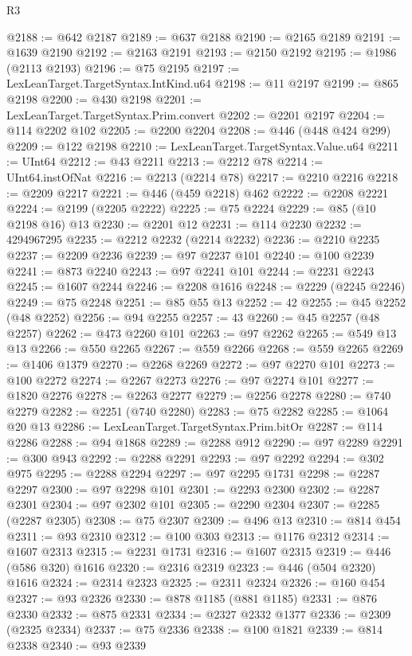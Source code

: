 \begin{lexlean}{R3}
\begin{coremodule}
@2188 := @642 @2187
@2189 := @637 @2188
@2190 := @2165 @2189
@2191 := @1639 @2190
@2192 := @2163 @2191
@2193 := @2150 @2192
@2195 := @1986 (@2113 @2193)
@2196 := @75 @2195
@2197 := LexLeanTarget.TargetSyntax.IntKind.u64
@2198 := @11 @2197
@2199 := @865 @2198
@2200 := @430 @2198
@2201 := LexLeanTarget.TargetSyntax.Prim.convert
@2202 := @2201 @2197
@2204 := @114 @2202 @102
@2205 := @2200 @2204
@2208 := @446 (@448 @424 @299)
@2209 := @122 @2198
@2210 := LexLeanTarget.TargetSyntax.Value.u64
@2211 := UInt64
@2212 := @43 @2211
@2213 := @2212 @78
@2214 := UInt64.instOfNat
@2216 := @2213 (@2214 @78)
@2217 := @2210 @2216
@2218 := @2209 @2217
@2221 := @446 (@459 @2218) @462
@2222 := @2208 @2221
@2224 := @2199 (@2205 @2222)
@2225 := @75 @2224
@2229 := @85 (@10 @2198 @16) @13
@2230 := @2201 @12
@2231 := @114 @2230
@2232 := 4294967295
@2235 := @2212 @2232 (@2214 @2232)
@2236 := @2210 @2235
@2237 := @2209 @2236
@2239 := @97 @2237 @101
@2240 := @100 @2239
@2241 := @873 @2240
@2243 := @97 @2241 @101
@2244 := @2231 @2243
@2245 := @1607 @2244
@2246 := @2208 @1616
@2248 := @2229 (@2245 @2246)
@2249 := @75 @2248
@2251 := @85 @55 @13
@2252 := 42
@2255 := @45 @2252 (@48 @2252)
@2256 := @94 @2255
@2257 := 43
@2260 := @45 @2257 (@48 @2257)
@2262 := @473 @2260 @101
@2263 := @97 @2262
@2265 := @549 @13 @13
@2266 := @550 @2265
@2267 := @559 @2266
@2268 := @559 @2265
@2269 := @1406 @1379
@2270 := @2268 @2269
@2272 := @97 @2270 @101
@2273 := @100 @2272
@2274 := @2267 @2273
@2276 := @97 @2274 @101
@2277 := @1820 @2276
@2278 := @2263 @2277
@2279 := @2256 @2278
@2280 := @740 @2279
@2282 := @2251 (@740 @2280)
@2283 := @75 @2282
@2285 := @1064 @20 @13
@2286 := LexLeanTarget.TargetSyntax.Prim.bitOr
@2287 := @114 @2286
@2288 := @94 @1868
@2289 := @2288 @912
@2290 := @97 @2289
@2291 := @300 @943
@2292 := @2288 @2291
@2293 := @97 @2292
@2294 := @302 @975
@2295 := @2288 @2294
@2297 := @97 @2295 @1731
@2298 := @2287 @2297
@2300 := @97 @2298 @101
@2301 := @2293 @2300
@2302 := @2287 @2301
@2304 := @97 @2302 @101
@2305 := @2290 @2304
@2307 := @2285 (@2287 @2305)
@2308 := @75 @2307
@2309 := @496 @13
@2310 := @814 @454
@2311 := @93 @2310
@2312 := @100 @303
@2313 := @1176 @2312
@2314 := @1607 @2313
@2315 := @2231 @1731
@2316 := @1607 @2315
@2319 := @446 (@586 @320) @1616
@2320 := @2316 @2319
@2323 := @446 (@504 @2320) @1616
@2324 := @2314 @2323
@2325 := @2311 @2324
@2326 := @160 @454
@2327 := @93 @2326
@2330 := @878 @1185 (@881 @1185)
@2331 := @876 @2330
@2332 := @875 @2331
@2334 := @2327 @2332 @1377
@2336 := @2309 (@2325 @2334)
@2337 := @75 @2336
@2338 := @100 @1821
@2339 := @814 @2338
@2340 := @93 @2339

\end{coremodule}
\end{lexlean}

